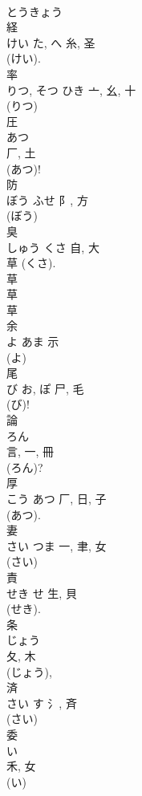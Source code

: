 \documentclass[8pt]{extreport}
\begin{document}
\begin{CJK}{UTF8}{min}
\\	とうきょう 
\\	経	
\\	けい	た, へ	糸, 圣	
\\	(けい). 
\\	率	
\\	りつ, そつ	ひき	亠, 幺, 十		
\\	(りつ) 
\\	圧	
\\	あつ	
\\	厂, 土	
\\	(あつ)!
\\	防	
\\	ぼう	ふせ	阝, 方	
\\	(ぼう) 
\\	臭	
\\	しゅう	くさ	自, 大	
\\	草 (くさ). 
\\	草 
\\	草 
\\	草 
\\	余	
\\	よ	あま	示		
\\	(よ) 
\\	尾	
\\	び	お, ぽ	尸, 毛	
\\	(び)! 
\\	論	
\\	ろん	
\\	言, 一, 冊		
\\	(ろん)?
\\	厚	
\\	こう	あつ	厂, 日, 子	
\\	(あつ). 
\\	妻	
\\	さい	つま	一, 聿, 女	
\\	(さい) 
\\	責	
\\	せき	せ	生, 貝	
\\	(せき). 
\\	条	
\\	じょう	
\\	夂, 木	
\\	(じょう), 
\\	済	
\\	さい	す	氵, 斉	
\\	(さい) 
\\	委	
\\	い	
\\	禾, 女	
\\	(い) 

\end{CJK}
\end{document}
